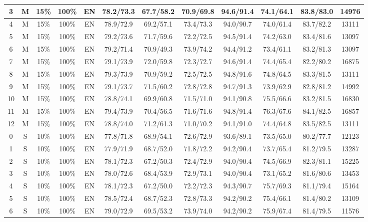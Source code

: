 \begin{table*}
{\begin{tabular}{|c|c|c|c|c||c|c|c|c|c|c||c|}
3 & M & 15\% & 100\% & EN & 78.2/73.3 & 67.7/58.2 & 70.9/69.8 & 94.6/91.4 & 74.1/64.1 & 83.8/83.0 & 14976 \\ \hline
4 & M & 15\% & 100\% & EN & 78.9/72.9 & 69.2/57.1 & 73.4/73.3 & 94.0/90.7 & 74.0/61.4 & 83.7/82.2 & 13111 \\ \hline
5 & M & 15\% & 100\% & EN & 79.2/73.6 & 71.7/59.6 & 72.2/72.5 & 94.5/91.4 & 74.2/63.0 & 83.4/81.6 & 13097 \\ \hline
6 & M & 15\% & 100\% & EN & 79.2/71.4 & 70.9/49.3 & 73.9/74.2 & 94.4/91.2 & 73.4/61.1 & 83.2/81.3 & 13097 \\ \hline
7 & M & 15\% & 100\% & EN & 79.1/73.9 & 72.0/59.8 & 72.3/72.7 & 94.6/91.4 & 74.4/65.4 & 82.2/80.2 & 16875 \\ \hline
8 & M & 15\% & 100\% & EN & 79.3/73.9 & 70.9/59.2 & 72.5/72.5 & 94.8/91.6 & 74.8/64.5 & 83.3/81.5 & 13111 \\ \hline
9 & M & 15\% & 100\% & EN & 79.1/73.7 & 71.5/60.2 & 72.8/72.8 & 94.7/91.3 & 73.9/62.9 & 82.8/81.2 & 14992 \\ \hline
10 & M & 15\% & 100\% & EN & 78.8/74.1 & 69.9/60.8 & 71.5/71.0 & 94.1/90.8 & 75.5/66.6 & 83.2/81.5 & 16830 \\ \hline
11 & M & 15\% & 100\% & EN & 79.4/73.9 & 70.4/56.5 & 71.6/71.6 & 94.8/91.4 & 76.3/67.6 & 84.1/82.5 & 16857 \\ \hline
12 & M & 15\% & 100\% & EN & 78.8/74.0 & 71.2/61.3 & 71.0/70.2 & 94.1/91.0 & 74.4/64.8 & 83.5/82.5 & 13111 \\ \hline
0 & S & 10\% & 100\% & EN & 77.8/71.8 & 68.9/54.1 & 72.6/72.9 & 93.6/89.1 & 73.5/65.0 & 80.2/77.7 & 12123 \\ \hline
1 & S & 10\% & 100\% & EN & 77.9/71.9 & 68.7/52.0 & 71.8/72.2 & 94.2/90.4 & 73.7/65.4 & 81.2/79.5 & 13287 \\ \hline
2 & S & 10\% & 100\% & EN & 78.1/72.3 & 67.2/50.3 & 72.4/72.9 & 94.0/90.4 & 74.5/66.9 & 82.3/81.1 & 15225 \\ \hline
3 & S & 10\% & 100\% & EN & 78.0/72.6 & 68.4/53.9 & 72.9/73.1 & 94.0/90.4 & 73.1/65.2 & 81.6/80.6 & 13453 \\ \hline
4 & S & 10\% & 100\% & EN & 78.1/72.3 & 67.2/50.0 & 72.2/72.3 & 94.3/90.7 & 75.7/69.3 & 81.1/79.4 & 15164 \\ \hline
5 & S & 10\% & 100\% & EN & 78.5/72.4 & 68.7/52.3 & 72.8/73.3 & 94.2/90.2 & 75.4/66.1 & 81.4/80.2 & 13109 \\ \hline
6 & S & 10\% & 100\% & EN & 79.0/72.9 & 69.5/53.2 & 73.9/74.0 & 94.2/90.2 & 75.9/67.4 & 81.4/79.5 & 11576 \\ \hline

\end{tabular}}
\end{table*}
